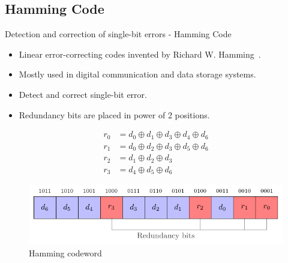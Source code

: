 \subsection{Hamming Code}
    \begin{frame}{Detection and correction of single-bit errors - Hamming Code}
        \begin{block}{}
            \begin{itemize}
                \justifying
                \item Linear error-correcting codes invented by Richard W. Hamming~\cite{H-50-bstj}.
                \item Mostly used in digital communication and data storage systems.
                \item Detect and correct single-bit error.
                \item Redundancy bits are placed in power of 2 positions.
            \end{itemize}
        \end{block}

        \begin{minipage}[c]{0.4\linewidth}
            \begin{equation} \label{equat:hamming_encoder}
                \begin{split}
                    r_{0} &= d_{0} \oplus d_{1} \oplus d_{3} \oplus d_{4} \oplus d_{6} \\
                    r_{1} &= d_{0} \oplus d_{2} \oplus d_{3} \oplus d_{5} \oplus d_{6} \\
                    r_{2} &= d_{1} \oplus d_{2} \oplus d_{3} \\
                    r_{3} &= d_{4} \oplus d_{5} \oplus d_{6}
                \end{split}
            \end{equation}
        \end{minipage}\hfill%
        \begin{minipage}[c]{0.55\linewidth}
            \begin{figure}
                \centering
                \includegraphics[width=\textwidth, page=1]{src/4_strategies/img/hamming_bit.pdf}
                \caption{Hamming codeword}
                \label{fig:hamming_codeword}
            \end{figure}
        \end{minipage}
    \end{frame}
    
